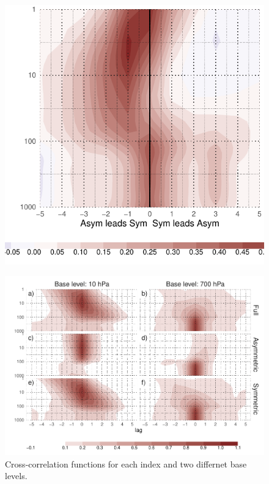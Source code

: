 \documentclass[]{ametsocV5}
\begin{document}
\begin{figure}
\includegraphics{A1-1} \label{fig:A1}
\end{figure}

\begin{figure}
\includegraphics{ccf-levels-1} \caption[Cross-correlation functions for each index and two differnet base levels]{Cross-correlation functions for each index and two differnet base levels.}\label{fig:ccf-levels}
\end{figure}
\end{document}

